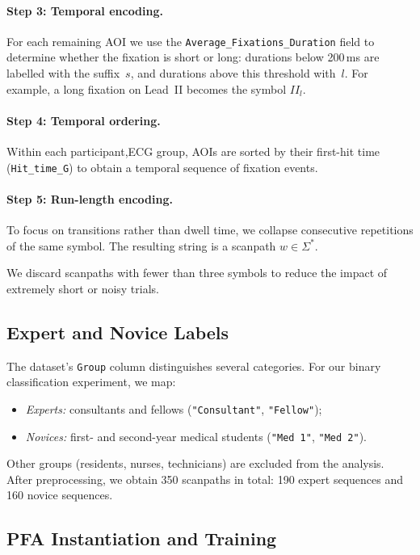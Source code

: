 \documentclass[sigconf]{acmart}
\theoremstyle{plain}
\theoremstyle{definition}
\begin{document}
\paragraph{Step 3: Temporal encoding.}
For each remaining AOI we use the \texttt{Average\_Fixations\_Duration} field to determine whether the fixation is short or long:
durations below 200\,ms are labelled with the suffix~$s$, and durations above this threshold with~$l$.
For example, a long fixation on Lead~II becomes the symbol $II_l$.

\paragraph{Step 4: Temporal ordering.}
Within each participant,ECG group, AOIs are sorted by their first-hit time (\texttt{Hit\_time\_G}) to obtain a temporal sequence of fixation events.

\paragraph{Step 5: Run-length encoding.}
To focus on transitions rather than dwell time, we collapse consecutive repetitions of the same symbol.
The resulting string is a scanpath $w \in \Sigma^*$.

We discard scanpaths with fewer than three symbols to reduce the impact of extremely short or noisy trials.

\subsection{Expert and Novice Labels}

The dataset's \texttt{Group} column distinguishes several categories.
For our binary classification experiment, we map:
\begin{itemize}
    \item \emph{Experts:} consultants and fellows (\texttt{"Consultant"}, \texttt{"Fellow"});
    \item \emph{Novices:} first- and second-year medical students (\texttt{"Med 1"}, \texttt{"Med 2"}).
\end{itemize}
Other groups (residents, nurses, technicians) are excluded from the analysis.
After preprocessing, we obtain 350 scanpaths in total: 190 expert sequences and 160 novice sequences.

\subsection{PFA Instantiation and Training}
\end{document}

